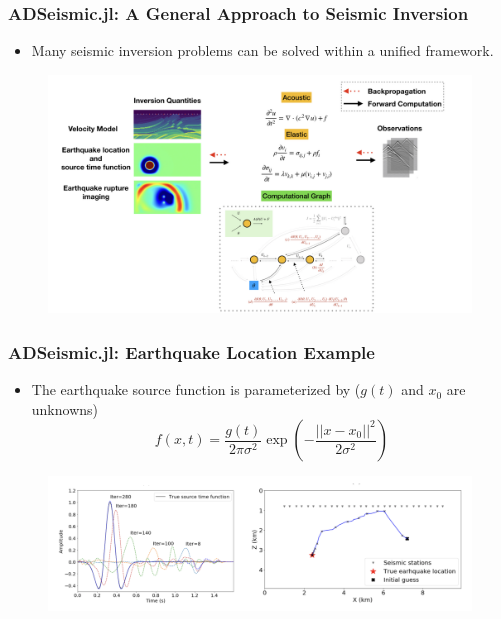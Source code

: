 \documentclass{beamer}
\begin{document}



\begin{frame}
	\frametitle{ADSeismic.jl: A General Approach to Seismic Inversion}
	\begin{itemize}
		\item Many seismic inversion problems can be solved within a unified framework. 
	\end{itemize}
	\begin{figure}[hbt]
  \includegraphics[width=1.0\textwidth]{../adseimic.jpeg}
\end{figure}
	
\end{frame}

\begin{frame}
	\frametitle{ADSeismic.jl: Earthquake Location Example}
	\begin{itemize}
		\item The earthquake source function is parameterized by ($g(t)$ and $x_0$ are unknowns)
		$$f(x, t) =  \frac{g(t)}{2\pi \sigma^2} \exp \left( -\frac{||x - x_0||^2}{2 \sigma^2} \right)$$
	\end{itemize}
	\begin{figure}[hbt]
  \includegraphics[width=1.0\textwidth]{../source_time}
\end{figure}
\end{frame}
\end{document}
